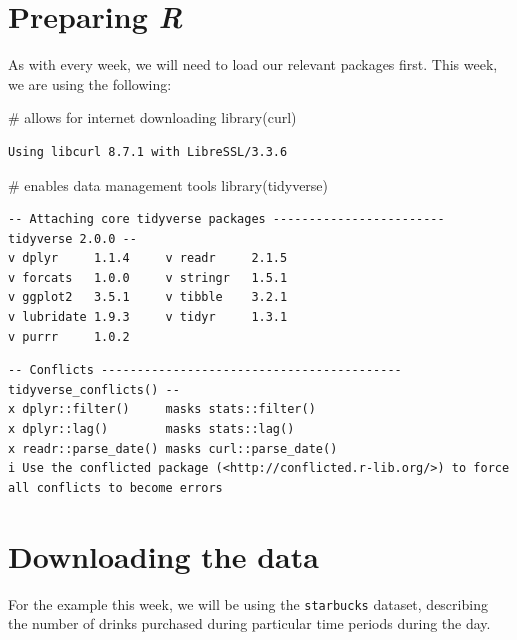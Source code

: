 \documentclass[
  letterpaper,
  DIV=11,
  numbers=noendperiod]{scrreprt}
\newenvironment{Shaded}{\begin{snugshade}}{\end{snugshade}}
\newcommand{\CommentTok}[1]{\textcolor[rgb]{0.37,0.37,0.37}{#1}}
\newcommand{\FunctionTok}[1]{\textcolor[rgb]{0.28,0.35,0.67}{#1}}
\newcommand{\NormalTok}[1]{\textcolor[rgb]{0.00,0.23,0.31}{#1}}
\begin{document}
\section{\texorpdfstring{Preparing
\emph{R}}{Preparing R}}\label{preparing-r}

As with every week, we will need to load our relevant packages first.
This week, we are using the following:

\begin{Shaded}
\begin{Highlighting}[]
\CommentTok{\# allows for internet downloading}
\FunctionTok{library}\NormalTok{(curl)}
\end{Highlighting}
\end{Shaded}

\begin{verbatim}
Using libcurl 8.7.1 with LibreSSL/3.3.6
\end{verbatim}

\begin{Shaded}
\begin{Highlighting}[]
\CommentTok{\# enables data management tools}
\FunctionTok{library}\NormalTok{(tidyverse)}
\end{Highlighting}
\end{Shaded}

\begin{verbatim}
-- Attaching core tidyverse packages ------------------------ tidyverse 2.0.0 --
v dplyr     1.1.4     v readr     2.1.5
v forcats   1.0.0     v stringr   1.5.1
v ggplot2   3.5.1     v tibble    3.2.1
v lubridate 1.9.3     v tidyr     1.3.1
v purrr     1.0.2     
\end{verbatim}

\begin{verbatim}
-- Conflicts ------------------------------------------ tidyverse_conflicts() --
x dplyr::filter()     masks stats::filter()
x dplyr::lag()        masks stats::lag()
x readr::parse_date() masks curl::parse_date()
i Use the conflicted package (<http://conflicted.r-lib.org/>) to force all conflicts to become errors
\end{verbatim}

\section{Downloading the data}\label{downloading-the-data}

For the example this week, we will be using the \texttt{starbucks}
dataset, describing the number of drinks purchased during particular
time periods during the day.
\end{document}
